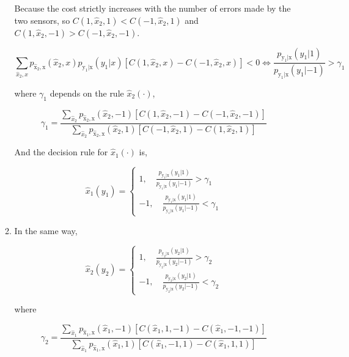 \documentclass[a4paper]{article}
\begin{document}
\begin{enumerate}
\begin{enumerate}
Because the cost strictly increases with the number of errors made by the two sensors, so $C(1,\hat{x}_2,1)<C(-1,\hat{x}_2,1)$  and $C(1,\hat{x}_2,-1)>C(-1,\hat{x}_2,-1)$.

\begin{equation}
  \sum_{\hat x_2,x} p_{\hat{\mathrm{x}}_2,\mathrm{x}}(\hat x_2,x) p_{\mathrm{y}_1 | \mathrm{x}}(y_1|x)\left[C(1,\hat{x}_2,x)-C(-1,\hat{x}_2,x) \right]<0 \Longleftrightarrow \frac {p_{\mathrm{y}_1 | \mathrm{x}}(y_1|1)}{p_{\mathrm{y}_1 | \mathrm{x}}(y_1|-1)} > \gamma_1
\end{equation}

where $\gamma_1$ depends on the rule $\hat x_2(\cdot)$, 

\begin{equation}\label{eq:gamma}
  \gamma_1 = \frac {\sum_{\hat x_2} p_{\hat{\mathrm{x}}_2,\mathrm{x}} (\hat{x}_2,-1)\left[C(1,\hat{x}_2,-1)-C(-1,\hat{x}_2,-1) \right]}{ \sum_{\hat x_2} p_{\hat{\mathrm{x}}_2,\mathrm{x}} (\hat{x}_2,1)\left[C(-1,\hat{x}_2,1)-C(1,\hat{x}_2,1) \right]}
\end{equation}

And the decision rule for $\hat x_1(\cdot)$ is,

\begin{equation}
  \hat x_1(y_1)= \left\{ \begin{aligned}
  1, \quad \frac {p_{\mathrm{y}_1 | \mathrm{x}}(y_1|1)}{p_{\mathrm{y}_1 | \mathrm{x}}(y_1|-1)} > \gamma_1 \\
  -1, \quad \frac {p_{\mathrm{y}_1 | \mathrm{x}}(y_1|1)}{p_{\mathrm{y}_1 | \mathrm{x}}(y_1|-1)} < \gamma_1 
\end{aligned}
\right.
\end{equation}

\item In the same way,

\begin{equation}\label{eq:rule2}
  \hat x_2(y_2)= \left\{ \begin{aligned}
  1, \quad \frac {p_{\mathrm{y}_2 | \mathrm{x}}(y_2|1)}{p_{\mathrm{y}_2 | \mathrm{x}}(y_2|-1)} > \gamma_2 \\
  -1, \quad \frac {p_{\mathrm{y}_2 | \mathrm{x}}(y_2|1)}{p_{\mathrm{y}_2 | \mathrm{x}}(y_2|-1)} < \gamma_2
\end{aligned}
\right.
\end{equation}

where 

\begin{equation}
  \gamma_2 = \frac {\sum_{\hat x_1} p_{\hat{\mathrm{x}}_1,\mathrm{x}} (\hat{x}_1,-1)\left[C(\hat{x}_1,1,-1)-C(\hat{x}_1,-1,-1) \right]}{ \sum_{\hat x_1} p_{\hat{\mathrm{x}}_1,\mathrm{x}} (\hat{x}_1,1)\left[C(\hat{x}_1,-1,1)-C(\hat{x}_1,1,1) \right]}
\end{equation}


\end{enumerate}
\end{enumerate}
\end{document}
